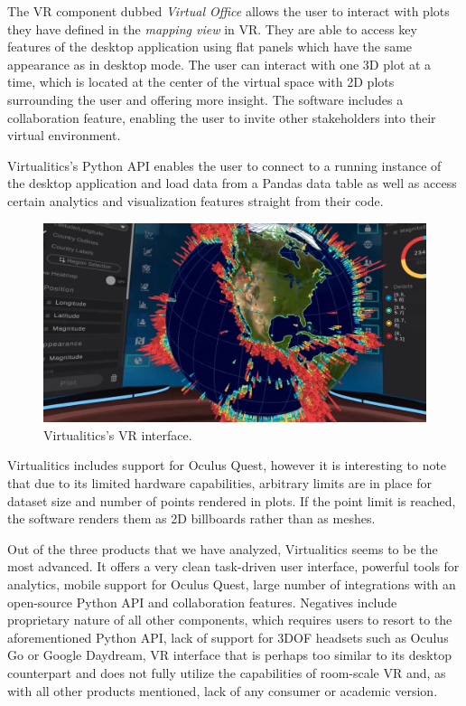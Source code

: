 \documentclass[thesis=M,english,hidelinks]{FITthesisXE}[2012/06/26]
\begin{document}
The VR component dubbed \emph{Virtual Office} allows the user to interact with plots they have defined in the \emph{mapping view} in VR. They are able to access key features of the desktop application using flat panels which have the same appearance as in desktop mode. The user can interact with one 3D plot at a time, which is located at the center of the virtual space with 2D plots surrounding the user and offering more insight. The software includes a collaboration feature, enabling the user to invite other stakeholders into their virtual environment.

Virtualitics's Python API enables the user to connect to a running instance of the desktop application and load data from a Pandas data table as well as access certain analytics and visualization features straight from their code.

\begin{figure}[ht]
\centering
\includegraphics[scale=0.2]{virtualitics_vr}
\caption{Virtualitics's VR interface.\autocite{virtualiticsvideo}}
\label{fig:virtualitics_vr}
\end{figure}

Virtualitics includes support for Oculus Quest, however it is interesting to note that due to its limited hardware capabilities, arbitrary limits are in place for dataset size and number of points rendered in plots. If the point limit is reached, the software renders them as 2D billboards rather than as meshes.\autocite{virtualiticsquest}

Out of the three products that we have analyzed, Virtualitics seems to be the most advanced. It offers a very clean task-driven user interface, powerful tools for analytics, mobile support for Oculus Quest, large number of integrations with an open-source Python API and collaboration features. Negatives include proprietary nature of all other components, which requires users to resort to the aforementioned Python API, lack of support for 3DOF headsets such as Oculus Go or Google Daydream, VR interface that is perhaps too similar to its desktop counterpart and does not fully utilize the capabilities of room-scale VR and, as with all other products mentioned, lack of any consumer or academic version.
\end{document}

